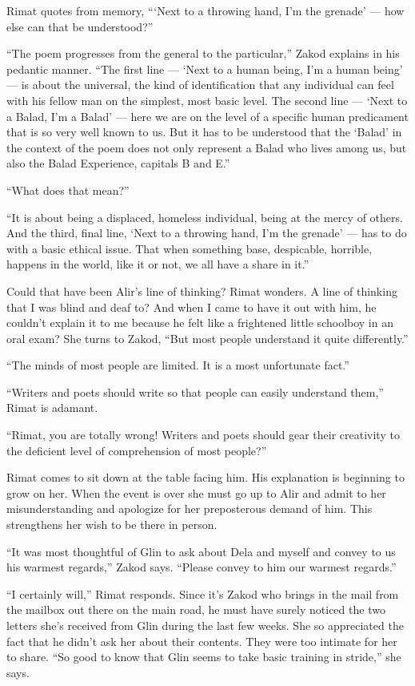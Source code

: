\documentclass[twoside,11pt,openany]{book}
\begin{document}
Rimat quotes from memory, ``{\thinspace}`Next to a throwing hand, I'm the grenade' --- how else can that be
understood?''

``The poem progresses from the general to the particular,'' Zakod explains in his pedantic
manner. ``The first line --- `Next to a human being, I'm a human being' --- is about the universal, the kind
of identification that any individual can feel with his fellow man on the simplest, most basic level. The second line
--- `Next to a Balad, I'm a Balad' --- here we are on the level of a specific human predicament that is so very well
known to us. But it has to be understood that the `Balad' in the context of the poem does not only represent a Balad
who lives among us, but also the Balad Experience, capitals B and E.''

``What does that mean?''

``It is about being a displaced, homeless individual, being at the mercy of others. And the third, final
line, `Next to a throwing hand, I'm the grenade' --- has to do with a basic ethical issue. That when something base,
despicable, horrible, happens in the world, like it or not, we all have a share in
it.''

Could that have been Alir's line of thinking?  Rimat wonders.  A line of thinking that I was blind and deaf to? And
when I came to have it out with him, he couldn't explain it to me because he felt like a frightened little schoolboy in
an oral exam? She turns to{ }Zakod, ``But most people understand
it quite differently.''

``The minds of most people are limited. It is a most unfortunate fact.''

``Writers and poets should write so that people can easily understand them,'' Rimat is
adamant.

``Rimat, you are totally wrong! Writers and poets should gear their creativity to the deficient level of
comprehension of most people?''

Rimat comes to sit down at the table facing him. His explanation is beginning to grow on her. When the event is over she
must go up to Alir and admit to her misunderstanding and apologize for her preposterous demand of him. This strengthens
her wish to be there in person.

``It was most thoughtful of Glin to ask about Dela and{ }myself and convey to us his
warmest regards,'' Zakod says. ``Please convey to him our warmest regards.''

``I certainly will,'' Rimat responds. Since it's Zakod who brings in the mail from the mailbox
out there on the main road, he must have surely noticed   the two letters she's received from Glin during the last
few weeks. She so appreciated the fact that he didn't ask her about their contents. They were too intimate for her to
share. ``So good to know that Glin seems to take basic training in stride,'' she says.
\end{document}
